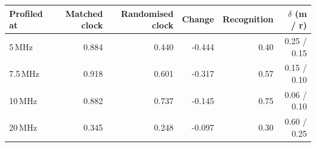 \begin{tabular}{lrrrrr}
\hline
Profiled at & Matched clock & Randomised clock & Change & Recognition & $\delta$ (m / r) \\
\hline
5\,MHz & 0.884 & 0.440 & -0.444 & 0.40 & 0.25 / 0.15 \\
7.5\,MHz & 0.918 & 0.601 & -0.317 & 0.57 & 0.15 / 0.10 \\
10\,MHz & 0.882 & 0.737 & -0.145 & 0.75 & 0.06 / 0.10 \\
20\,MHz & 0.345 & 0.248 & -0.097 & 0.30 & 0.60 / 0.25 \\
\hline
\end{tabular}

